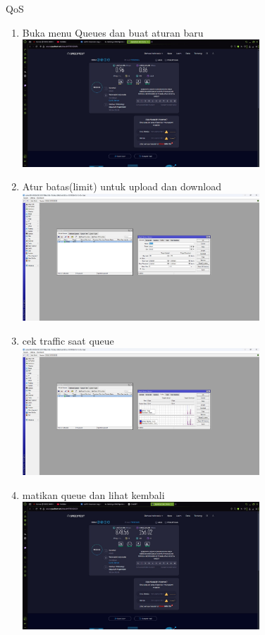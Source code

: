 QoS
\begin{enumerate}
	\item Buka menu Queues dan buat aturan baru\\
	\includegraphics[width=0.7\textwidth]{P5/img/queue.jpg}
	\item Atur batas(limit) untuk upload dan download\\
	\includegraphics[width=0.7\textwidth]{P5/img/setqueue.jpg}
	\item cek traffic saat queue\\
	\includegraphics[width=0.7\textwidth]{P5/img/traffic.jpg}
	\item matikan queue dan lihat kembali
	\includegraphics[width=0.7\textwidth]{P5/img/noqueue.jpg}
	
\end{enumerate}


